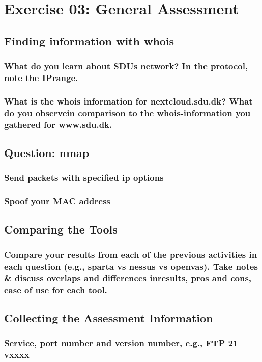 \section{Exercise 03: General Assessment}
\subsection{Finding information with whois}
\subsubsection{What do you learn about SDUs network? In the protocol, note the IPrange.}
\subsubsection{What is the whois information for nextcloud.sdu.dk? What do you observein comparison to the whois-information you gathered for www.sdu.dk.}

\subsection{Question: nmap}
\subsubsection{Send packets with specified ip options}
\subsubsection{Spoof your MAC address}

\subsection{Comparing the Tools}
\subsubsection{Compare your results from each of the previous activities in each question (e.g., sparta vs nessus vs openvas). Take notes \& discuss overlaps and differences inresults, pros and cons, ease of use for each tool.}


\subsection{Collecting the Assessment Information}
\subsubsection{Service, port number and version number, e.g., FTP 21 vxxxx}
